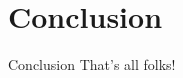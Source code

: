 \documentclass{beamer}
\begin{document}



    




    


\section{Conclusion}

\begin{frame}{Conclusion}
	That's all folks!
\end{frame}



\end{document}
